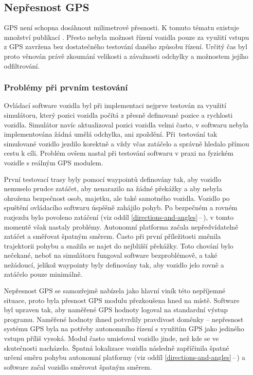 \documentclass[czech, bachelor]{diploma}
\newcommand{\filipref}[1]{\ref{#1}\,--\,\nameref{#1}}
\begin{document}
\subsection{Nepřesnost GPS} \label{gps-inaccuracy}

GPS není schopna dosáhnout milimetrové přesnosti. K tomuto tématu existuje množství publikací \cite{gps-inaccuracy-source}. Přesto
nebyla možnost řízení vozidla pouze za využití vstupu z GPS zavržena bez dostatečného testování daného způsobu řízení. Určitý čas
byl proto věnován právě zkoumání velikosti a závažnosti odchylky a možnostem jejího odfiltrování.

\subsubsection{Problémy při prvním testování}

Ovládací software vozidla byl při implementaci nejprve testován za využití simulátoru, který pozici vozidla počítá z přesně
definované pozice a rychlosti vozidla. Simulátor navíc aktualizoval pozici vozidla velmi často, v softwaru nebyla implementována
žádná umělá odchylka, ani zpoždění. Při~testování tak simulované vozidlo jezdilo korektně a vždy včas zatáčelo a správně hledalo
přímou cestu k cíli. Problém ovšem nastal při testování softwaru v praxi na fyzickém vozidle s reálným GPS modulem.

První testovací trasy byly pomocí waypointů definovány tak, aby vozidlo nemuselo prudce zatáčet, aby nenarazilo na žádné překážky
a aby nebyla ohrožena bezpečnost osob, majetku, ale také samotného vozidla. Vozidlo po spuštění ovládacího softwaru úspěšně
zahájilo pohyb. Po bezpečném a rovném rozjezdu bylo povoleno zatáčení (viz oddíl \filipref{directions-and-angles}), v tomto
momentě však nastaly problémy. Autonomní platforma začala nepředvídatelně zatáčet a směřovat špatným směrem. Často při první
příležitosti změnila trajektorii pohybu a snažila se najet do nejbližší překážky. Toto chování bylo nečekané, neboť na simulátoru
fungoval software bezproblémově, a také nežádoucí, jelikož waypointy byly definovány tak, aby vozidlo jelo rovně a zatáčelo pouze
minimálně.

Nepřesnost GPS se samozřejmě nabízela jako hlavní viník této nepříjemné situace, proto byla přesnost GPS modulu přezkoušena hned
na místě. Software byl upraven tak, aby naměřené GPS hodnoty logoval na standardní výstup programu. Naměřené hodnoty ihned
potvrdily pravdivost doměnky -- nepřesnost systému GPS byla na potřeby autonomního řízení s využitím GPS jako jediného vstupu
příliš vysoká. Modul často umisťoval vozidlo jinde, než kde se ve skutečnosti nacházelo. Špatná lokalizace vozidla následně
zapříčinila špatné určení směru pohybu autonomní platformy (viz oddíl \filipref{directions-and-angles}) a software začal vozidlo
směrovat špatným směrem.
\end{document}
